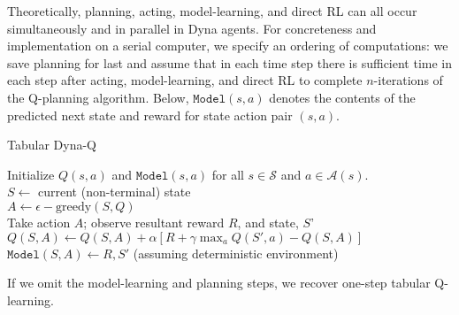 \documentclass[12pt]{article}
\begin{document}
\begin{figure}[h]
\end{figure}

Theoretically, planning, acting, model-learning, and direct RL can all occur simultaneously and in parallel in Dyna agents. For concreteness and implementation on a serial computer, we specify an ordering of computations: we save planning for last and assume that in each time step there is sufficient time in each step after acting, model-learning, and direct RL to complete $n$-iterations of the Q-planning algorithm. Below, $\texttt{Model}(s,a)$ denotes the contents of the predicted next state and reward for state action pair $(s,a)$.

\begin{algorithm}[h]
  \caption{Tabular Dyna-Q}
  Initialize $Q(s,a)$ and $\texttt{Model}(s,a)$ for all $s \in \mathcal S$ and   $a \in \mathcal A(s)$. \\
 {
  $S \gets $ current (non-terminal) state \\
  $A \gets \epsilon-\textrm{greedy}(S,Q)$ \\
  Take action $A$; observe resultant reward $R$, and state, $S$' \\
  $Q(S,A) \gets Q(S,A) + \alpha \left[ R + \gamma \max_a Q(S', a) -     Q(S,A)\right]$ 
$\texttt{Model}(S,A) \gets R, S'$ (assuming deterministic environment) 
}
\end{algorithm}
If we omit the model-learning and planning steps, we recover one-step tabular Q-learning.
\end{document}
